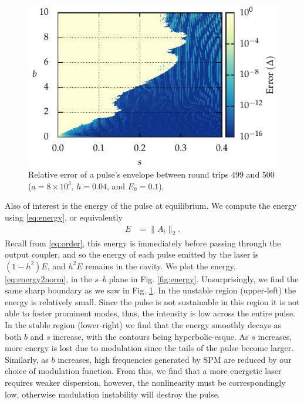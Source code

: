 \documentclass[9pt,twocolumn,twoside]{osajnl}
\begin{document}
\begin{figure}[tbp]
	\centering
	\includegraphics{Figures/ParamSpaceErr}
	\caption{Relative error of a pulse's envelope between round trips 499 and 500 ($a = 8 \times 10^3$, $h = 0.04$, and $E_0 = 0.1$).}
	\label{fig:error}
\end{figure}

Also of interest is the energy of the pulse at equilibrium. We compute the energy using \eqref{eq:energy}, or equivalently 
\begin{align}
	E &= \| A_i \|_2.
	\label{eq:energy2norm}
\end{align}
Recall from \eqref{eq:order}, this energy is immediately before passing through the output coupler, and so the energy of each pulse emitted by the laser is $(1 - h^2) E$, and $h^2 E$ remains in the cavity. We plot the energy, \eqref{eq:energy2norm}, in the $s$--$b$ plane in Fig. \ref{fig:energy}. Unsurprisingly, we find the same sharp boundary as we saw in Fig. \ref{fig:error}. In the unstable region (upper-left) the energy is relatively small. Since the pulse is not sustainable in this region it is not able to foster prominent modes, thus, the intensity is low across the entire pulse. In the stable region (lower-right) we find that the energy smoothly decays as both $b$ and $s$ increase, with the contours being hyperbolic-esque. As $s$ increases, more energy is lost due to modulation since the tails of the pulse become larger. Similarly, as $b$ increases, high frequencies generated by SPM are reduced by our choice of modulation function. From this, we find that a more energetic laser requires weaker dispersion, however, the nonlinearity must be correspondingly low, otherwise modulation instability will destroy the pulse.
\end{document}
